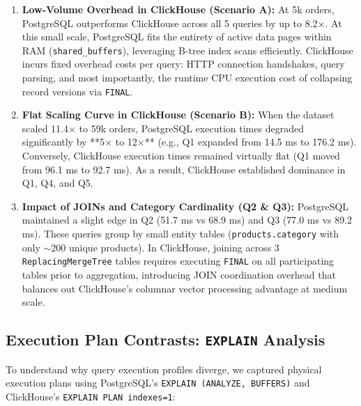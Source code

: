 \documentclass[peerreviewca]{IEEEtran}
\begin{document}
\begin{enumerate}
    \item \textbf{Low-Volume Overhead in ClickHouse (Scenario A):} At 5k orders, PostgreSQL outperforms ClickHouse across all 5 queries by up to 8.2$\times$. At this small scale, PostgreSQL fits the entirety of active data pages within RAM (\texttt{shared\_buffers}), leveraging B-tree index scans efficiently. ClickHouse incurs fixed overhead costs per query: HTTP connection handshakes, query parsing, and most importantly, the runtime CPU execution cost of collapsing record versions via \texttt{FINAL}.
    
    \item \textbf{Flat Scaling Curve in ClickHouse (Scenario B):} When the dataset scaled 11.4$\times$ to 59k orders, PostgreSQL execution times degraded significantly by **5$\times$ to 12$\times$** (e.g., Q1 expanded from 14.5 ms to 176.2 ms). Conversely, ClickHouse execution times remained virtually flat (Q1 moved from 96.1 ms to 92.7 ms). As a result, ClickHouse established dominance in Q1, Q4, and Q5.
    
    \item \textbf{Impact of JOINs and Category Cardinality (Q2 \& Q3):} PostgreSQL maintained a slight edge in Q2 (51.7 ms vs 68.9 ms) and Q3 (77.0 ms vs 89.2 ms). These queries group by small entity tables (\texttt{products.category} with only $\sim$200 unique products). In ClickHouse, joining across 3 \texttt{ReplacingMergeTree} tables requires executing \texttt{FINAL} on all participating tables prior to aggregation, introducing JOIN coordination overhead that balances out ClickHouse's columnar vector processing advantage at medium scale.
\end{enumerate}

\subsection{Execution Plan Contrasts: \texttt{EXPLAIN} Analysis}
To understand why query execution profiles diverge, we captured physical execution plans using PostgreSQL's \texttt{EXPLAIN (ANALYZE, BUFFERS)} and ClickHouse's \texttt{EXPLAIN PLAN indexes=1}:
\end{document}
